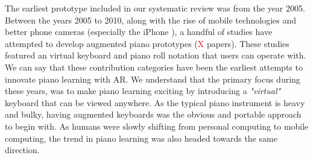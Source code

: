 \documentclass[sigchi, review]{acmart}
\newcommand{\red}[1]{\textcolor{red}{#1}}
\begin{document}

The earliest prototype included in our systematic review was from the year 2005. Between the years 2005 to 2010, along with the rise of mobile technologies and better phone cameras (especially the iPhone \cite{querashi2012apple}), a handful of studies have attempted to develop augmented piano prototypes (\red{X} papers). These studies featured an virtual keyboard and piano roll notation that users can operate with. We can say that these contribution categories have been the earliest attempts to innovate piano learning with AR. We understand that the primary focus during these years, was to make piano learning exciting by introducing a \textit{"virtual"} keyboard that can be viewed anywhere. As the typical piano instrument is heavy and bulky, having augmented keyboards was the obvious and portable approach to begin with. As humans were slowly shifting from personal computing to mobile computing, the trend in piano learning was also headed towards the same direction.
\end{document}
